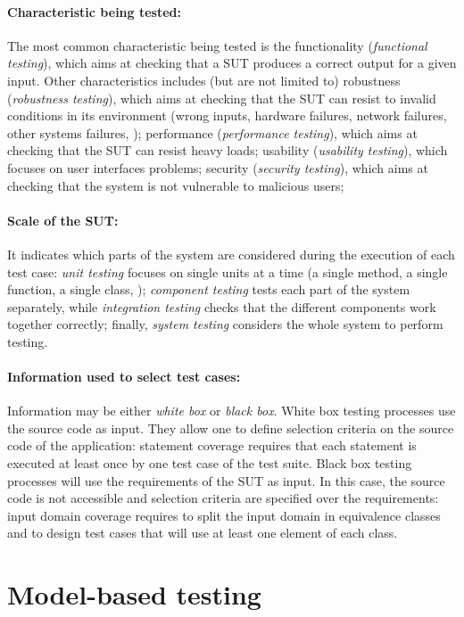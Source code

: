 \paragraph{Characteristic being tested:} 
%
The most common characteristic being tested is the functionality (\emph{functional testing}), which aims at checking that a SUT produces a correct output for a given input. Other characteristics includes (but are not limited to) robustness (\emph{robustness testing}), which aims at checking that the SUT can resist to invalid conditions in its environment (\eg wrong inputs, hardware failures, network failures, other systems failures, \etc); performance (\emph{performance testing}), which aims at checking that the SUT can resist heavy loads; usability (\emph{usability testing}), which focuses on user interfaces problems; security (\emph{security testing}), which aims at checking that the system is not vulnerable to malicious users; \etc
 
\paragraph{Scale of the SUT:} 
%
It indicates which parts of the system are considered during the execution of each test case: \emph{unit testing} focuses on single units at a time (\eg a single method, a single function, a single class, \etc); \emph{component testing} tests each part of the system separately, while \emph{integration testing} checks that the different components work together correctly; finally, \emph{system testing} considers the whole system to perform testing.

\paragraph{Information used to select test cases:} 
%
Information may be either \emph{white box} or \emph{black box}. White box testing processes use the source code as input. They allow one to define selection criteria on the source code of the application: \eg statement coverage requires that each statement is executed at least once by one test case of the test suite. Black box testing processes will use the requirements of the SUT as input. In this case, the source code is not accessible and selection criteria are specified over the requirements: \eg input domain coverage requires to split the input domain in equivalence classes and to design test cases that will use at least one element of each class.


\section{Model-based testing}




